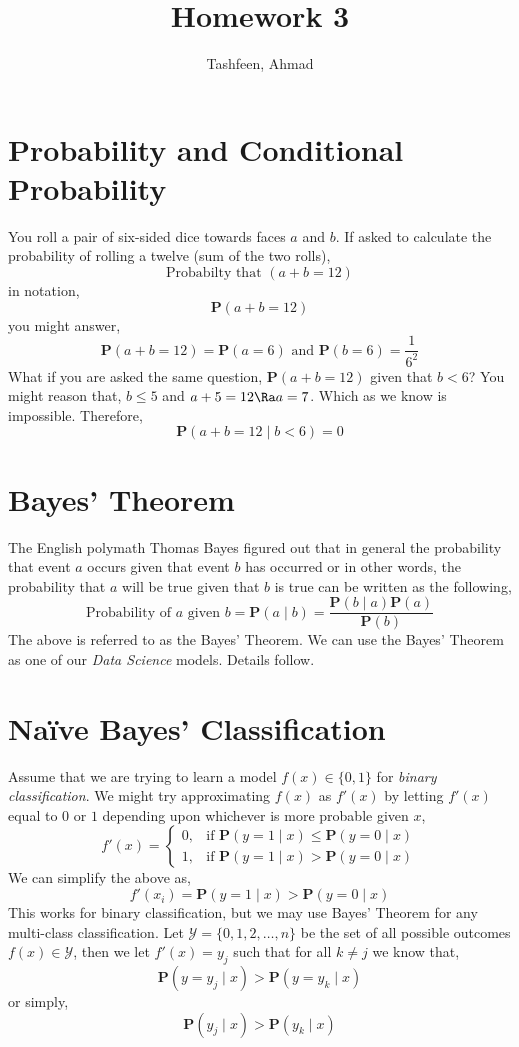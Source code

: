 \documentclass{homework}
\author{Tashfeen, Ahmad}
\title{Homework 3}
\renewcommand\P{\mathbf{P}}
\newcommand\Y{\mathcal{Y}}
\begin{document}
 \maketitle
\section{Probability and Conditional Probability}
You roll a pair of six-sided dice towards faces $a$ and $b$. If asked to calculate the probability of rolling a twelve (sum of the two rolls),
\[
  \text{Probabilty that }(a+b=12)
\]
in notation,
\[
  \P(a+b=12)
\]
you might answer,
\[
  \P(a+b=12) = \P(a = 6) \text{ and } \P(b = 6) = \frac{1}{6^2}
\]
What if you are asked the same question, $\P(a+b=12)$ given that $b < 6$? You might reason that, $b \leq 5$ and $a+5=12 \Ra a = 7$. Which as we know is impossible. Therefore,
\[
  \P(a+b=12 \mid b < 6) = 0
\]
\section{Bayes' Theorem}

The English polymath Thomas Bayes figured out that in general the probability that event $a$ occurs given that event $b$ has occurred or in other words, the probability that $a$ will be true given that $b$ is true can be written as the following,
\[
  \text{Probability of } a \text{ given } b = \P(a \mid b) = \frac{\P(b \mid a)\P(a)}{\P(b)}
\]
The above is referred to as the Bayes' Theorem. We can use the Bayes' Theorem as one of our \textit{Data Science} models. Details follow.
\section{Na\"ive Bayes' Classification}
Assume that we are trying to learn a model $f(x) \in \{0, 1\}$ for \textit{binary classification}. We might try approximating $f(x)$ as $f'(x)$ by letting $f'(x)$ equal to $0$ or $1$ depending upon whichever is more probable given $x$,
\[
  f'(x) =
  \begin{cases}
    0, & \text{if } \P(y=1 \mid x) \leq \P(y=0 \mid x) \\
    1, & \text{if } \P(y=1 \mid x) > \P(y=0 \mid x)
  \end{cases}
\]
We can simplify the above as,
\[
  f'(x_i) = \P(y=1 \mid x) > \P(y=0 \mid x)
\]
This works for binary classification, but we may use Bayes' Theorem for any multi-class classification. Let $\Y = \{0, 1, 2,\hdots, n\}$ be the set of all possible outcomes \ie $f(x) \in \Y$, then we let $f'(x) = y_j$ such that for all $k \neq j$ we know that,
\[
  \P(y=y_j \mid x) >  \P(y=y_k \mid x)
\]
or simply,
\[
  \P(y_j \mid x) >  \P(y_k \mid x)
\]
\end{document}
